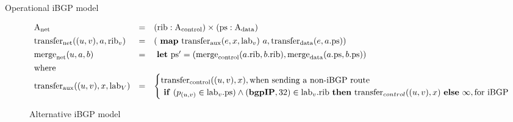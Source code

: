 \documentclass[sigconf,10pt]{acmart}
\begin{document}
\begin{listing}[ht]
\begin{ocamlcode}
{    let /$\merge_{\net}$/ u a b =
      let ps' = /$\merge_{\data}$/ u a.ps b.ps in
      let rib' = /$\merge_{\control}$/ u a.rib b.rib in
      let rib'' = fold (/$\lambda$/ newRib p. installRoute u newRib p) rib' ps' in
      (rib'', ps')
\end{ocamlcode}
\caption{Operational iBGP model}
\label{lst:ibgp-model}
\end{listing}

\begin{figure}
\[ \begin{array}{lll}
     \mathrm{A}_{\mathrm{net}} &=& (\mathrm{rib} : \mathrm{A}_{\mathrm{control}}) \times (\mathrm{ps}: \mathrm{A}_{\mathrm{data}})\\[0.4em]
     \mathrm{transfer}_{\mathrm{net}}((u,v),a,\mathrm{rib}_v) &=& (~\mathbf{map}~
     \mathrm{transfer}_{\mathrm{aux}}(e,x,\mathrm{lab}_v)~a, \mathrm{transfer}_{\mathrm{data}}(e, a.\mathrm{ps}))\\[0.4em]
     
     \mathrm{merge}_{\mathrm{net}}(u,a,b)&=& ~\mathbf{let}~ \mathrm{ps}' = ( \mathrm{merge}_{\mathrm{control}}(a.\mathrm{rib},b.\mathrm{rib}), \mathrm{merge}_{\mathrm{data}}(a.\mathrm{ps}, b.\mathrm{ps})) \\[0.4em]
     \text{where }\\
     \mathrm{transfer}_{\mathrm{aux}}((u,v),x,\mathrm{lab}_V) &= &
     \begin{cases}
       \mathrm{transfer}_{\mathrm{control}}((u,v), x),  \text{when sending a non-iBGP route} \\
       ~\mathbf{if}~ (p_{(u,v)} \in \mathrm{lab}_v.\mathrm{ps}) \wedge (\mathbf{bgpIP},32) \in \mathrm{lab}_v.\mathrm{rib} ~\mathbf{then}~ \mathrm{transfer}_{control}((u,v),x) ~\mathbf{else}~ \infty,  \text{for iBGP}
     \end{cases}\\
\end{array} \]
\caption{Alternative iBGP model}
\label{fig:alternative-ibgp-model}
\end{figure}
\end{document}
